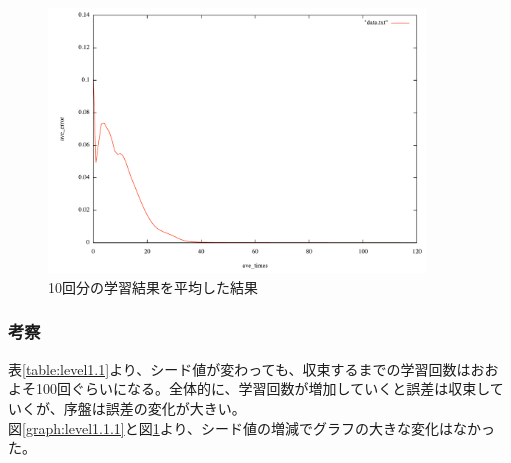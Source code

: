 \begin{figure}[h]
\begin{center}
\includegraphics[width=10.0cm]{level1/ex_ave.pdf}
\caption{10回分の学習結果を平均した結果}
\label{graph:level1.1.2}
\end{center}
\end{figure}

\subsubsection{考察}
表\ref{table:level1.1}より、シード値が変わっても、収束するまでの学習回数はおおよそ100回ぐらいになる。全体的に、学習回数が増加していくと誤差は収束していくが、序盤は誤差の変化が大きい。\\
図\ref{graph:level1.1.1}と図\ref{graph:level1.1.2}より、シード値の増減でグラフの大きな変化はなかった。
